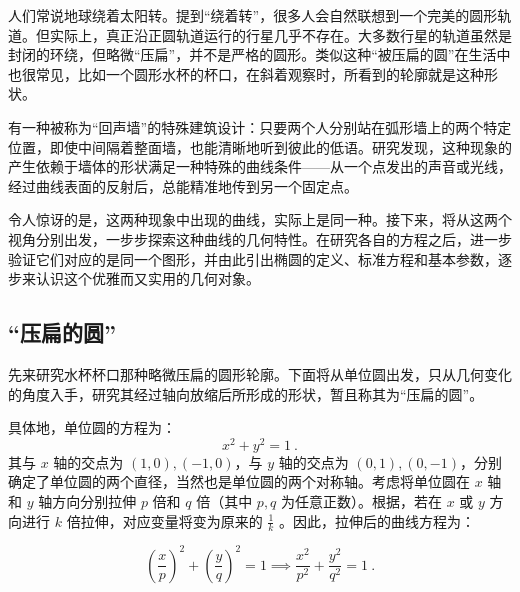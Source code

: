 
\begin{issues}
\issueDraft
\end{issues}


人们常说地球绕着太阳转。提到“绕着转”，很多人会自然联想到一个完美的圆形轨道。但实际上，真正沿正圆轨道运行的行星几乎不存在。大多数行星的轨道虽然是封闭的环绕，但略微“压扁”，并不是严格的圆形。类似这种“被压扁的圆”在生活中也很常见，比如一个圆形水杯的杯口，在斜着观察时，所看到的轮廓就是这种形状。

有一种被称为“回声墙”的特殊建筑设计：只要两个人分别站在弧形墙上的两个特定位置，即使中间隔着整面墙，也能清晰地听到彼此的低语。研究发现，这种现象的产生依赖于墙体的形状满足一种特殊的曲线条件——从一个点发出的声音或光线，经过曲线表面的反射后，总能精准地传到另一个固定点。

令人惊讶的是，这两种现象中出现的曲线，实际上是同一种。接下来，将从这两个视角分别出发，一步步探索这种曲线的几何特性。在研究各自的方程之后，进一步验证它们对应的是同一个图形，并由此引出椭圆的定义、标准方程和基本参数，逐步来认识这个优雅而又实用的几何对象。

\subsection{“压扁的圆”}\label{sub_Elips3_1}

先来研究水杯杯口那种略微压扁的圆形轮廓。下面将从单位圆出发，只从几何变化的角度入手，研究其经过轴向放缩后所形成的形状，暂且称其为“压扁的圆”。

具体地，单位圆的方程为：
\begin{equation}
x^2 + y^2 = 1~.
\end{equation}
其与 $x$ 轴的交点为 $(1, 0), (-1, 0)$，与 $y$ 轴的交点为 $(0, 1), (0, -1)$，分别确定了单位圆的两个直径，当然也是单位圆的两个对称轴。考虑将单位圆在 $x$ 轴和 $y$ 轴方向分别拉伸 $p$ 倍和 $q$ 倍（其中 $p, q$ 为任意正数）。根据，若在 $x$ 或 $y$ 方向进行 $k$ 倍拉伸，对应变量将变为原来的 $\displaystyle\frac{1}{k}$ 。因此，拉伸后的曲线方程为：

\begin{equation}\label{eq_Elips3_2}
\left(\frac{x}{p}\right)^2 + \left(\frac{y}{q}\right)^2 = 1\implies\frac{x^2}{p^2} + \frac{y^2}{q^2} = 1~.
\end{equation}

